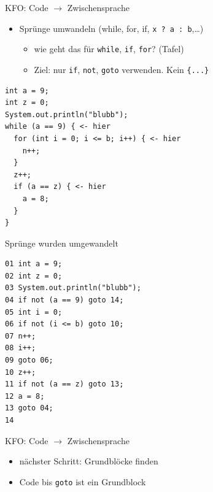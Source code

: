 \documentclass[18pt]{beamer}
\begin{document}
	\begin{frame}[fragile]{KFO: Code $\rightarrow$ Zwischensprache}
	\begin{itemize}
		\item Sprünge umwandeln (while, for, if, \texttt{x ? a : b},\dots)
		\begin{itemize} 
			\item wie geht das für \texttt{while}, \texttt{if}, \texttt{for}? (Tafel)
			\item Ziel: nur \texttt{if}, \texttt{not}, \texttt{goto} verwenden. Kein \texttt{\{...\}}
		\end{itemize}
	\end{itemize}
	\centering
	\begin{verbatim}
int a = 9;
int z = 0;
System.out.println("blubb");
while (a == 9) { <- hier
  for (int i = 0; i <= b; i++) { <- hier
    n++;
  }
  z++;
  if (a == z) { <- hier
    a = 8;
  }
}
	\end{verbatim}
	\end{frame}

	\begin{frame}[fragile]{Sprünge wurden umgewandelt}
	\begin{verbatim}
01 int a = 9;
02 int z = 0;
03 System.out.println("blubb");
04 if not (a == 9) goto 14;
05 int i = 0;
06 if not (i <= b) goto 10;
07 n++;
08 i++;
09 goto 06;
10 z++;
11 if not (a == z) goto 13;
12 a = 8;
13 goto 04;
14
	\end{verbatim}
	\end{frame}

\begin{frame}{KFO: Code $\rightarrow$ Zwischensprache}
	\begin{itemize}
		\item nächster Schritt: Grundblöcke finden
		\item Code bis \texttt{goto} ist ein Grundblock
	\end{itemize}
\end{frame}
\end{document}
